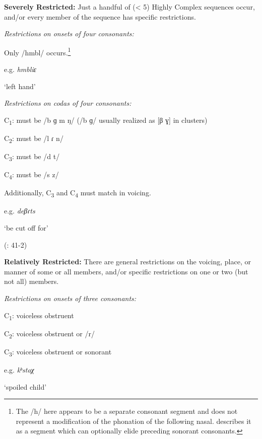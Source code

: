 \ea\label{ex:3.27}
  \textbf{Severely Restricted:} Just a handful of (< 5) Highly Complex sequences occur, and/or every member of the sequence has specific restrictions.

\ea 
{}

\textit{Restrictions on onsets of four consonants:}

Only /hmbl/ occurs.\footnote{{The /h/ here appears to be a separate consonant segment and does not represent a modification of the phonation of the following nasal. \citet[54]{Marmion2010} describes it as a segment which can optionally elide preceding sonorant consonants.}}

e.g.  \textit{hmbliɛ}

    ‘left hand’
\citep[69]{Marmion2010}

\ex
{}

\textit{Restrictions on codas of four consonants:}

C\textsubscript{1}: must be /b ɡ m ŋ/ (/b ɡ/ usually realized as [β ɣ] in clusters)

C\textsubscript{2}: must be /l ɾ n/

C\textsubscript{3}: must be /d t/

C\textsubscript{4}: must be /s z/
\z
\z

Additionally, C\textsubscript{3} and C\textsubscript{4} must match in voicing.

e.g.   \textit{deβɾts}

    ‘be cut off for’

(\citealt{WieringWiering1995}: 41-2)

\ea\label{ex:3.28}
  \textbf{Relatively Restricted:} There are general restrictions on the voicing, place, or manner of some or all members, and/or specific restrictions on one or two (but not all) members.

\ea
{}

\textit{Restrictions on onsets of three consonants:}

C\textsubscript{1}: voiceless obstruent

C\textsubscript{2}: voiceless obstruent or /r/

C\textsubscript{3}: voiceless obstruent or sonorant

e.g.  \textit{kʰstaχ}

    ‘spoiled child’
\citep[37]{Haspelmath1993}

\ex
{}

